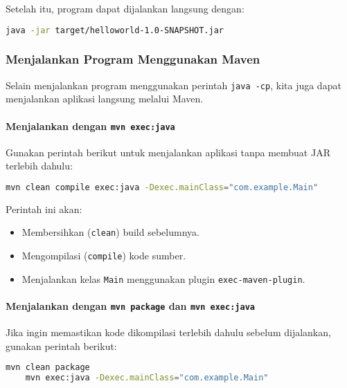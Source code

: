 Setelah itu, program dapat dijalankan langsung dengan:

\begin{lstlisting}[language=bash]
	java -jar target/helloworld-1.0-SNAPSHOT.jar
\end{lstlisting}


\subsubsection{Menjalankan Program Menggunakan Maven}
Selain menjalankan program menggunakan perintah \texttt{java -cp}, kita juga dapat menjalankan aplikasi langsung melalui Maven.

\paragraph{Menjalankan dengan \texttt{mvn exec:java}}
Gunakan perintah berikut untuk menjalankan aplikasi tanpa membuat JAR terlebih dahulu:

\begin{lstlisting}[language=bash]
	mvn clean compile exec:java -Dexec.mainClass="com.example.Main"
\end{lstlisting}

Perintah ini akan:
\begin{itemize}
	\item Membersihkan (\texttt{clean}) build sebelumnya.
	\item Mengompilasi (\texttt{compile}) kode sumber.
	\item Menjalankan kelas \texttt{Main} menggunakan plugin \texttt{exec-maven-plugin}.
\end{itemize}

\paragraph{Menjalankan dengan \texttt{mvn package} dan \texttt{mvn exec:java}}
Jika ingin memastikan kode dikompilasi terlebih dahulu sebelum dijalankan, gunakan perintah berikut:

\begin{lstlisting}[language=bash]
	mvn clean package
	mvn exec:java -Dexec.mainClass="com.example.Main"
\end{lstlisting}


